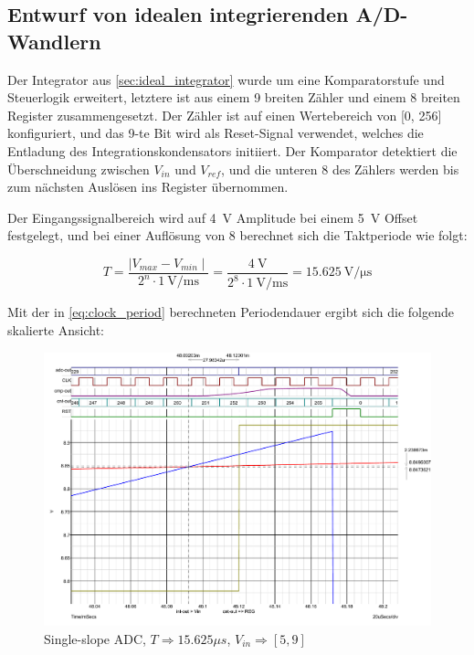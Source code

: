\documentclass[
	ngerman,
	parskip=half,
	headsepline,
	twocolumn,
	DIV=calc,
	listof=leveldown,
	]{scrartcl}
\begin{document}
		\subsection{Entwurf von idealen integrierenden A/D-Wandlern}
		
		\label{sec:single-slope-adc}		
	
		Der Integrator aus \cref{sec:ideal_integrator} wurde um eine Komparatorstufe und Steuerlogik erweitert, letztere ist aus einem \SI{9}{\bit} breiten Zähler und einem  \SI{8}{\bit} breiten Register zusammengesetzt. 
		Der Zähler ist auf einen Wertebereich von [0, 256] konfiguriert, und das 9-te Bit wird als Reset-Signal verwendet, welches die Entladung des Integrationskondensators initiiert.
		Der Komparator detektiert die Überschneidung zwischen $V_{in}$ und $V_{ref}$, und die unteren \SI{8}{\bit} des Zählers werden bis zum nächsten Auslösen ins Register übernommen.
		
		Der Eingangssignalbereich wird auf \SI{4}{\volt} Amplitude bei einem \SI{5}{\volt} Offset  festgelegt, und bei einer Auflösung von \SI{8}{\bit} berechnet sich die Taktperiode wie folgt: 
		
		\begin{equation}
		\label{eq:clock_period}
		T = \frac{\mid V_{max} - V_{min} \mid}{2^n  \cdot \SI{1}{\volt\per\milli\second}} = \frac{\SI{4}{\volt}}{2^8 \cdot \SI{1}{\volt\per\milli\second}} = \SI{15.625}{\volt\per\micro\second}	
		\end{equation}
		
		
		Mit der in \cref{eq:clock_period} berechneten Periodendauer ergibt sich die folgende skalierte Ansicht: 
		
		\begin{figure}[h!]
			\centering
			\includegraphics[width=\linewidth]{ideal_single_slope_odd_freq_comparator_slew_rate_wide}
			\caption[Single-slope ADC (\SI{250}{\hertz})]{Single-slope ADC, $T \Rightarrow 15.625\mu s$, $V_{in} \Rightarrow [5,  9]$}
			\label{fig:single-slope-ideal-slew-rate}
		\end{figure}	
	
\end{document}
